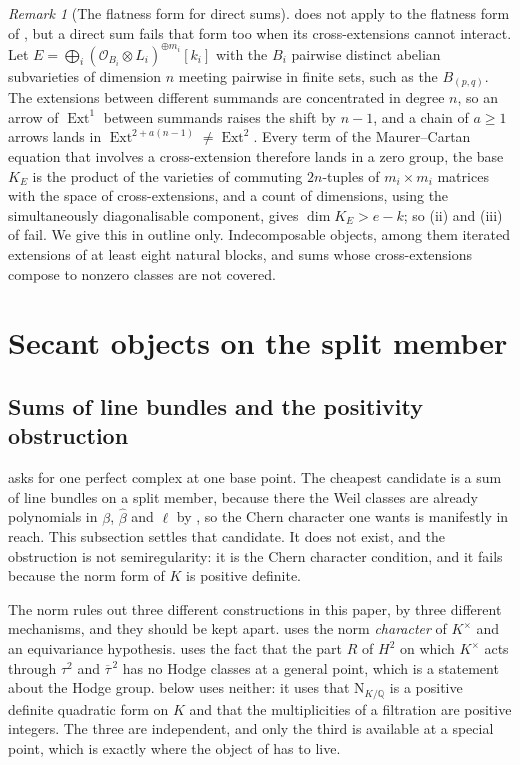 \documentclass[11pt,reqno]{amsart}
\theoremstyle{plain}
\theoremstyle{definition}
\theoremstyle{remark}
\newtheorem{remark}[theorem]{Remark}
\newcommand{\QQ}{\mathbb{Q}}
\newcommand{\cO}{\mathcal{O}}
\newcommand{\Nm}{\mathrm{N}}             %
\DeclareMathOperator{\Ext}{Ext}
\newcommand{\Kx}{K^{\times}}
\newcommand{\bbar}[1]{\overline{#1}}
\begin{document}
\begin{remark}[The flatness form for direct sums]\label{rem:flatsums}
 does not apply to the flatness form of
, but a direct sum fails that form too when its
cross-extensions cannot interact. Let $E=\bigoplus_{i}(\cO_{B_{i}}\otimes
L_{i})^{\oplus m_{i}}[k_{i}]$ with the $B_{i}$ pairwise distinct abelian
subvarieties of dimension $n$ meeting pairwise in finite sets, such as the
$B_{(p,q)}$. The extensions between different summands are concentrated in
degree $n$, so an arrow of $\Ext^{1}$ between summands raises the shift by
$n-1$, and a chain of $a\ge1$ arrows lands in $\Ext^{2+a(n-1)}\ne\Ext^{2}$.
Every term of the Maurer--Cartan equation that involves a cross-extension
therefore lands in a zero group, the base $K_{E}$ is the product of the
varieties of commuting $2n$-tuples of $m_{i}\times m_{i}$ matrices with the
space of cross-extensions, and a count of dimensions, using the
simultaneously diagonalisable component, gives $\dim K_{E}>e-k$; so (ii) and
(iii) of  fail. We give this in outline only. Indecomposable objects,
among them iterated extensions of at least eight natural blocks, and sums
whose cross-extensions compose to nonzero classes are not covered.
\end{remark}
\section{Secant objects on the split member}\label{sec:secantobjects}

\subsection{Sums of line bundles and the positivity obstruction}
\label{ssec:whatobject}

 asks for one perfect complex at one base point.
The cheapest candidate is a sum of line bundles on a split member, because
there the Weil classes are already polynomials in $\beta$, $\widehat\beta$ and
$\ell$ by \cite[Theorem~15.2]{paperI}, so the Chern character one wants is
manifestly in reach. This subsection settles that candidate. It does not
exist, and the obstruction is not semiregularity: it is the Chern character
condition, and it fails because the norm form of $K$ is positive
definite.

The norm rules out three different constructions in this paper, by three
different mechanisms, and they should be kept apart.
\cite[Theorem~5.6]{paperI} uses the norm \emph{character} of $\Kx$ and an
equivariance hypothesis. \cite[Proposition~15.18]{paperI} uses the fact that the part $R$
of $H^{2}$ on which $\Kx$ acts through $\tau^{2}$ and $\bbar\tau^{\,2}$ has no
Hodge classes at a general point, which is a statement about the Hodge group.
 below uses neither: it uses that $\Nm_{K/\QQ}$ is a
positive definite quadratic form on $K$ and that the multiplicities of a
filtration are positive integers. The three are independent, and only the
third is available at a special point, which is exactly where the object of
 has to live.
\end{document}
